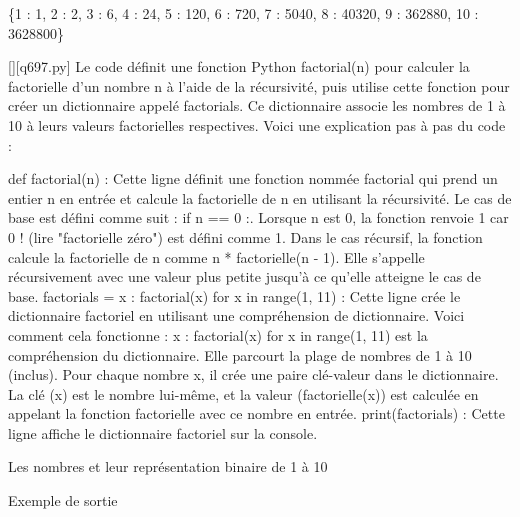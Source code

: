 \{1 : 1, 2 : 2, 3 : 6, 4 : 24, 5 : 120, 6 : 720, 7 : 5040, 8 : 40320, 9 : 362880, 10 : 3628800\}
        \par
        \begin{solution}
            \renewcommand{\nomfichier}{q697.py}
            \pythonfile{\chemincode \nomfichier}[][\nomfichier]
            Le code définit une fonction Python factorial(n) pour calculer la factorielle d'un nombre n à l'aide de la récursivité, puis utilise cette fonction pour créer un dictionnaire appelé factorials. Ce dictionnaire associe les nombres de 1 à 10 à leurs valeurs factorielles respectives. Voici une explication pas à pas du code :

    def factorial(n) : Cette ligne définit une fonction nommée factorial qui prend un entier n en entrée et calcule la factorielle de n en utilisant la récursivité.
        Le cas de base est défini comme suit : if n == 0 :. Lorsque n est 0, la fonction renvoie 1 car 0 ! (lire "factorielle zéro") est défini comme 1.
        Dans le cas récursif, la fonction calcule la factorielle de n comme n * factorielle(n - 1). Elle s'appelle récursivement avec une valeur plus petite jusqu'à ce qu'elle atteigne le cas de base.
    factorials = {x : factorial(x) for x in range(1, 11)} : Cette ligne crée le dictionnaire factoriel en utilisant une compréhension de dictionnaire. Voici comment cela fonctionne :
        {x : factorial(x) for x in range(1, 11)} est la compréhension du dictionnaire. Elle parcourt la plage de nombres de 1 à 10 (inclus).
        Pour chaque nombre x, il crée une paire clé-valeur dans le dictionnaire. La clé (x) est le nombre lui-même, et la valeur (factorielle(x)) est calculée en appelant la fonction factorielle avec ce nombre en entrée.
    print(factorials) : Cette ligne affiche le dictionnaire factoriel sur la console.
        \end{solution}
        

        \question
        Les nombres et leur représentation binaire de 1 à 10

Exemple de sortie

